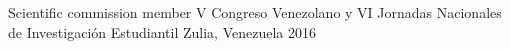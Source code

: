 \begin{cvhonors}
  \cvhonor
    {Scientific commission member}
    {V Congreso Venezolano y VI Jornadas Nacionales de Investigación Estudiantil}
    {Zulia, Venezuela}
    {2016}
\end{cvhonors}
